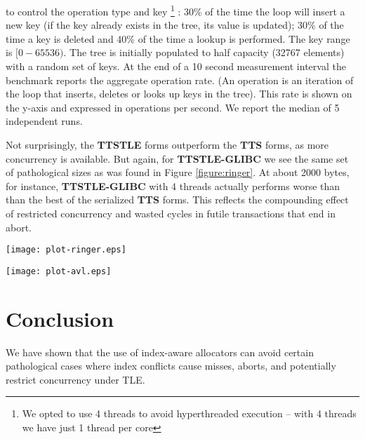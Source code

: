 \documentclass[preprint]{sigplanconf}
\begin{document}
to control the operation type and key \footnote{We opted to use 4 threads to
avoid hyperthreaded execution --  with 4 threads we have just 1 thread per core} :
30\% of the time the loop will insert a new key (if the key
already exists in the tree, its value is updated); 30\% of the time a key is deleted
and 40\% of the time a lookup is performed.  The key range is $[0-65536)$.  The
tree is initially populated to half capacity (32767 elements) with a random set of keys.  At the 
end of a 10 second measurement interval the benchmark reports the aggregate
operation rate.  (An operation is an iteration of the loop that inserts, deletes
or looks up keys in the tree).  This rate is shown on the y-axis and expressed
in operations per second.   We report the median of 5 independent runs.  

Not surprisingly, the \textbf{TTSTLE} forms outperform the \textbf{TTS} forms, 
as more concurrency is available.  But again, for \textbf{TTSTLE-GLIBC} we
see the same set of pathological sizes as was found in Figure \ref{figure:ringer}. 
At about 2000 bytes, for instance, \textbf{TTSTLE-GLIBC} with 4 threads actually
performs worse than than the best of the serialized \textbf{TTS} forms.  
This reflects the compounding effect of restricted concurrency and wasted cycles
in futile transactions that end in abort. 


\begin{figure*}[hbtp]
\begin{center}
\texttt{[image: plot-ringer.eps]}
\end{center}
\caption{Single-threaded ring traversal rates} 
\label{figure:ringer}
\end{figure*}

\begin{figure*}[hbtp]
\begin{center}
\texttt{[image: plot-avl.eps]}
\end{center}
\caption{AVL tree throughput with 4 threads} 
\label{figure:avl} 
\end{figure*}


\section{Conclusion}

We have shown that the use of index-aware allocators can avoid certain
pathological cases where index conflicts cause misses, aborts, and
potentially restrict concurrency under TLE.   
\end{document}
